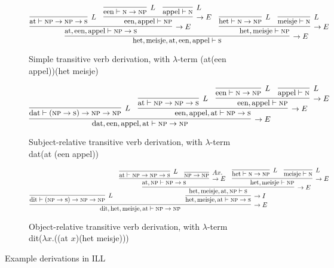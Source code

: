\begin{figure}
	\begin{subfigure}[b]{1\textwidth}
	\centering
	\small
		\[
		\infer[\rightarrow E]{\text{het}, \text{meisje}, \text{at}, \text{een}, \text{appel} \vdash \textsc{s}}{
			\infer[\rightarrow E]{\text{at}, \text{een}, \text{appel} \vdash \textsc{np} \to \textsc{s}}{
				\infer[L]{\text{at} \vdash \textsc{np} \to \textsc{np} \to \textsc{s}}{}
				&
				\infer[\rightarrow E]{\text{een}, \text{appel} \vdash \textsc{np}}{
					\infer[L]{\text{een} \vdash \textsc{n} \to \textsc{np}}{}
					&
					\infer[L]{\text{appel} \vdash \textsc{n}}{}
				}
			}
			&		
			\infer[\rightarrow E]{\text{het}, \text{meisje} \vdash \textsc{np}}{
				\infer[L]{\text{het} \vdash \textsc{n} \to \textsc{np}}{}
				&
				\infer[L]{\text{meisje} \vdash \textsc{n}}{}
			}
		}
		\]
		\caption{Simple transitive verb derivation, with $\lambda$-term (at(een appel))(het meisje)}
		\end{subfigure}
		\begin{subfigure}[b]{1\textwidth}
		\centering
		\scriptsize
		\[
		\infer[\rightarrow E]{\text{dat}, \text{een}, \text{appel}, \text{at} \vdash \textsc{np} \to \textsc{np}}{
			\infer[L]{\text{dat} \vdash (\textsc{np} \to \textsc{s}) \to \textsc{np} \to \textsc{np}}{}
			&
			\infer[\rightarrow E]{\text{een}, \text{appel}, \text{at} \vdash \textsc{np} \to \textsc{s}}{
				\infer[L]{\text{at} \vdash \textsc{np} \to \textsc{np} \to \textsc{s}}{}
				&
				\infer[\rightarrow E]{\text{een}, \text{appel} \vdash \textsc{np}}{
					\infer[L]{\text{een} \vdash \textsc{n} \to \textsc{np}}{}
					&
					\infer[L]{\text{appel} \vdash \textsc{n}}{}
				}
			}
		}
		\]
		\caption{Subject-relative transitive verb derivation, with $\lambda$-term dat(at (een appel))}
		\label{subfig:ill_dutch:sub}
		\end{subfigure}
		\begin{subfigure}[b]{1\textwidth}
		\centering
		\scriptsize
		\[
		\infer[\rightarrow E]{\text{dit}, \text{het}, \text{meisje}, \text{at} \vdash \textsc{np} \to \textsc{np}}{
			\infer[L]{\text{dit} \vdash (\textsc{np} \to \textsc{s})\to \textsc{np} \to \textsc{np}}{}
			&
			\infer[\rightarrow I]{\text{het}, \text{meisje}, \text{at} \vdash \textsc{np} \to \textsc{s}}{
				\infer[\rightarrow E]{\text{het}, \text{meisje}, \text{at}, \textsc{np} \vdash \textsc{s}}{
					\infer[\rightarrow E]{\text{at}, \textsc{np}\vdash \textsc{np} \to \textsc{s}}{
						\infer[L]{\text{at} \vdash \textsc{np} \to \textsc{np} \to \textsc{s}}{}
						&
						\infer[Ax.]{\textsc{np} \to \textsc{np}}{}
					}
					&
					\infer[\rightarrow E]{\text{het}, \text{meisje} \vdash \textsc{np}}{
						\infer[L]{\text{het} \vdash \textsc{n} \to \textsc{np}}{}
						&
						\infer[L]{\text{meisje} \vdash \textsc{n}}{}					
					}
				}
			}
		}
		\]
		\caption{Object-relative transitive verb derivation, with $\lambda$-term dit($\lambda x$.((at $x$)(het meisje)))}
		\label{subfig:ill_dutch:obj}
		\end{subfigure}
\caption[Example ILL Derivations]{Example derivations in ILL}
\label{fig:ill_dutch}
\end{figure}

